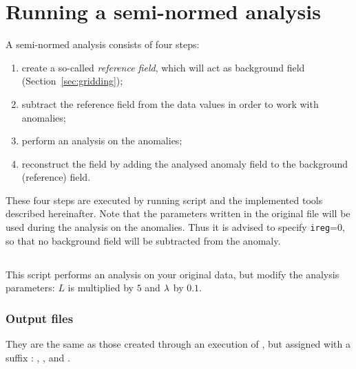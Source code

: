 \section{Running a semi-normed analysis}

A semi-normed analysis consists of four steps:
\begin{enumerate}
\item create a so-called \textit{reference field}, which will act as background field (Section~\ref{sec:gridding});
\item subtract the reference field from the data values in order to work with anomalies;
\item perform an analysis on the anomalies;
\item reconstruct the field by adding the analysed anomaly field to the background (reference) field.
\end{enumerate}

These four steps are executed by running script  and the implemented tools described hereinafter. Note that the parameters written in the original  file will be used during the analysis on the anomalies. Thus it is advised to specify \texttt{ireg}=0, so that no background field will be subtracted from the anomaly. 

\subsection{}

This script performs an analysis on your original data, but modify the analysis parameters: $L$ is multiplied by $5$ and $\lambda$ by $0.1$. 

\subsubsection{Output files}

They are the same as those created through an execution of , but assigned with a suffix :
, ,  and .


\subsection{}

